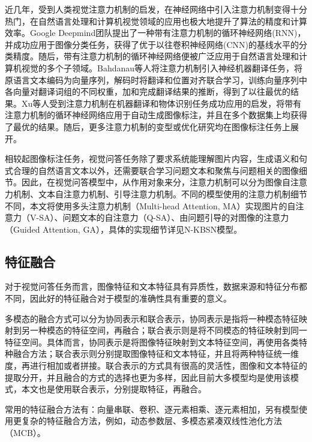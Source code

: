近几年，受到人类视觉注意力机制的启发，在神经网络中引入注意力机制变得十分热门，在自然语言处理和计算机视觉领域的应用也极大地提升了算法的精度和计算效率。Google Deepmind团队提出了一种带有注意力机制的循环神经网络(RNN)，并成功应用于图像分类任务，获得了优于以往卷积神经网络(CNN)的基线水平的分类精度。随后，带有注意力机制的循环神经网络便被广泛应用于自然语言处理和计算机视觉的多个子领域。Bahdanau等人将注意力机制引入神经机器翻译任务，将原语言文本编码为向量序列，解码时将翻译和位置对齐联合学习，训练向量序列中各向量对翻译词组的不同权重，加和完成翻译结果的推断，得到了以往最优的结果。Xu等人受到注意力机制在机器翻译和物体识别任务成功应用的启发，将带有注意力机制的循环神经网络应用于自动生成图像标注，并且在多个数据集上均获得了最优的结果。随后，更多注意力机制的变型或优化研究均在图像标注任务上展开。

相较起图像标注任务，视觉问答任务除了要求系统能理解图片内容，生成语义和句式合理的自然语言文本以外，还需要联合学习问题文本和聚焦与问题相关的图像细节。因此，在视觉问答模型中，从作用对象来分，注意力机制可以分为图像自注意力机制、文本自注意力机制、引导注意力机制。不同的模型使用的注意力机制细节不同，本文将使用多头注意力机制（Multi-head Attention, MA）实现图片的自注意力（V-SA）、问题文本的自注意力（Q-SA）、由问题引导的对图像的注意力（Guided Attention, GA），具体的实现细节详见N-KBSN模型。

\subsection{特征融合}
对于视觉问答任务而言，图像特征和文本特征具有异质性，数据来源和特征分布都不同，因此好的特征融合对于模型的准确性具有重要的意义。

多模态的融合方式可以分为协同表示和联合表示，协同表示是指将一种模态特征映射到另一种模态的特征空间，再融合；联合表示则是将不同模态的特征映射到同一特征空间。具体而言，协同表示是将图像特征映射到文本特征空间，再使用各类特种融合方法；联合表示则分别提取图像特征和文本特征，并且将两种特征统一维度，再进行相加或者拼接。联合表示的方式具有很高的灵活性，图像和文本特征的提取分开，并且融合的方式的选择也更为多样，因此目前大多模型均是使用该模式，本文也是使用联合表示，分别提取特征，再融合。

常用的特征融合方法有：向量串联、卷积、逐元素相乘、逐元素相加，另有模型使用更复杂的特征融合方法，例如，动态参数层、多模态紧凑双线性池化方法（MCB）。

